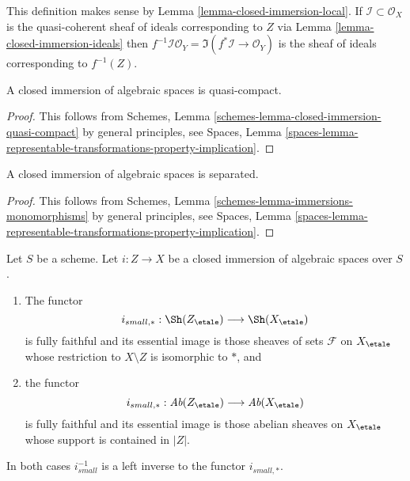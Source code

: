 \noindent
This definition makes sense by Lemma \ref{lemma-closed-immersion-local}.
If $\mathcal{I} \subset \mathcal{O}_X$ is the quasi-coherent sheaf of
ideals corresponding to $Z$ via Lemma \ref{lemma-closed-immersion-ideals} then
$f^{-1}\mathcal{I}\mathcal{O}_Y = \Im(f^*\mathcal{I} \to \mathcal{O}_Y)$
is the sheaf of ideals corresponding to $f^{-1}(Z)$.

\begin{lemma}
\label{lemma-closed-immersion-quasi-compact}
A closed immersion of algebraic spaces is quasi-compact.
\end{lemma}

\begin{proof}
This follows from
Schemes, Lemma \ref{schemes-lemma-closed-immersion-quasi-compact}
by general principles, see
Spaces, Lemma
\ref{spaces-lemma-representable-transformations-property-implication}.
\end{proof}

\begin{lemma}
\label{lemma-closed-immersion-separated}
A closed immersion of algebraic spaces is separated.
\end{lemma}

\begin{proof}
This follows from
Schemes, Lemma \ref{schemes-lemma-immersions-monomorphisms}
by general principles, see
Spaces, Lemma
\ref{spaces-lemma-representable-transformations-property-implication}.
\end{proof}

\begin{lemma}
\label{lemma-closed-immersion-push-pull}
Let $S$ be a scheme. Let $i : Z \to X$ be a closed immersion of algebraic
spaces over $S$.
\begin{enumerate}
\item The functor
$$
i_{small, *} :
\Sh(Z_\etale)
\longrightarrow
\Sh(X_\etale)
$$
is fully faithful and its essential image is those sheaves of sets
$\mathcal{F}$ on $X_\etale$ whose restriction to $X \setminus Z$ is
isomorphic to $*$, and
\item the functor
$$
i_{small, *} :
\textit{Ab}(Z_\etale)
\longrightarrow
\textit{Ab}(X_\etale)
$$
is fully faithful and its essential image is those abelian sheaves on
$X_\etale$ whose support is contained in $|Z|$.
\end{enumerate}
In both cases $i_{small}^{-1}$ is a left inverse to the functor
$i_{small, *}$.
\end{lemma}

